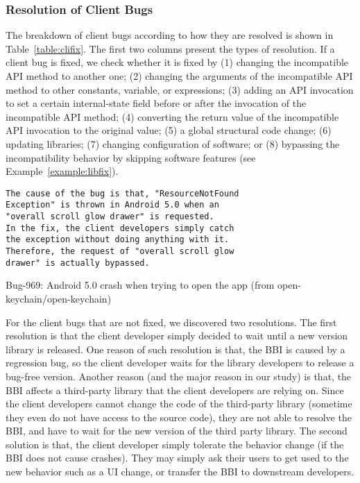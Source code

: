 \subsubsection{Resolution of Client Bugs}
The breakdown of client bugs according to how they are resolved is shown in Table~\ref{table:clifix}. The first two columns present the types of resolution. If a client bug is fixed, we check whether it is fixed by (1) changing the incompatible API method to another one; (2) changing the arguments of the incompatible API method to other constants, variable, or expressions; (3) adding an API invocation to set a certain internal-state field before or after the invocation of the incompatible API method; (4) converting the return value of the incompatible API invocation to the original value; (5) a global structural code change; (6) updating libraries; (7) changing configuration of software; or (8) bypassing the incompatibility behavior by skipping software features (see Example~\ref{example:libfix}).

\medskip
\begin{example}	
\begin{verbatim}
The cause of the bug is that, "ResourceNotFound 
Exception" is thrown in Android 5.0 when an 
"overall scroll glow drawer" is requested. 
In the fix, the client developers simply catch 
the exception without doing anything with it. 
Therefore, the request of "overall scroll glow 
drawer" is actually bypassed. 
\end{verbatim}
\caption{Bug-969: Android 5.0 crash when trying to open the app (\small{from open-keychain/open-keychain})} 
	\label{example:libfix}
\end{example}



For the client bugs that are not fixed, we discovered two resolutions. The first resolution is that the client developer simply decided to wait until a new version library is released. One reason of such resolution is that, the BBI is caused by a regression bug, so the client developer waits for the library developers to release a bug-free version. Another reason (and the major reason in our study) is that, the BBI affects a third-party library that the client developers are relying on. Since the client developers cannot change the code of the third-party library (sometime they even do not have access to the source code), they are not able to resolve the BBI, and have to wait for the new version of the third party library. The second solution is that, the client developer simply tolerate the behavior change (if the BBI does not cause crashes). They may simply ask their users to get used to the new behavior such as a UI change, or transfer the BBI to downstream developers. 

